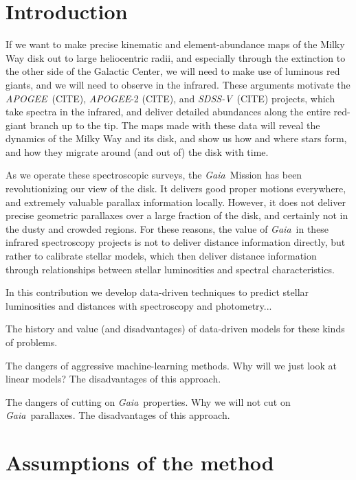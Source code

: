 \documentclass[modern]{aastex62}
\newcommand{\acronym}[1]{{\small{#1}}}
\newcommand{\project}[1]{\textsl{#1}}
\newcommand{\apogee}{\project{\acronym{APOGEE}}}
\newcommand{\gaia}{\project{Gaia}}
\newcommand{\sdssv}{\project{\acronym{SDSS-V}}}
\begin{document}

\section{Introduction} \label{sec:intro}

If we want to make precise kinematic and element-abundance maps
of the Milky Way disk out to large heliocentric radii,
and especially through the extinction to the other side of the Galactic Center, we will
need to make use of luminous red giants, and we will need to observe in
the infrared.
These arguments motivate the \apogee\ (CITE), \apogee-2 (CITE), and \sdssv\ (CITE)
projects, which take spectra in the infrared, and deliver detailed abundances
along the entire red-giant branch up to the tip.
The maps made with these data will reveal the dynamics of the Milky Way and its disk,
and show us how and where stars form, and how they migrate around (and out of) the
disk with time.

As we operate these spectroscopic surveys,
the \gaia\ Mission has been revolutionizing our view of the disk.
It delivers good proper motions everywhere,
and extremely valuable parallax information
locally.
However, it does not deliver precise geometric parallaxes over a large fraction of
the disk, and certainly not in the dusty and crowded regions.
For these reasons, the value of \gaia\ in these infrared spectroscopy projects is not
to deliver distance information directly, but rather to calibrate stellar models,
which then deliver distance information through relationships between stellar
luminosities and spectral characteristics.

In this contribution we develop data-driven techniques to predict
stellar luminosities and distances with spectroscopy and photometry...

The history and value (and disadvantages)
of data-driven models for these kinds of problems.

The dangers of aggressive machine-learning methods. Why will we just
look at linear models? The disadvantages of this approach.

The dangers of cutting on \gaia\ properties. Why we will not cut on
\gaia\ parallaxes. The disadvantages of this approach.

\section{Assumptions of the method}
\end{document}
